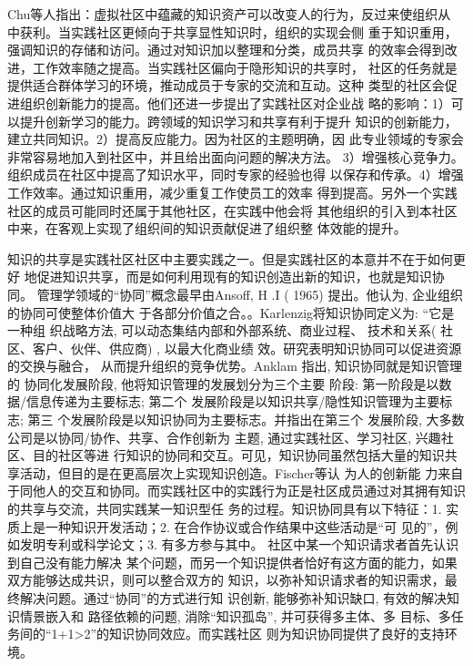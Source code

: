 \documentclass[12pt,a4paper,cs4size]{ctexart}
\begin{document}
Chu等人指出：虚拟社区中蕴藏的知识资产可以改变人的行为，反过来使组织从
中获利\cite{Chu2008}。当实践社区更倾向于共享显性知识时，组织的实现会侧
重于知识重用，强调知识的存储和访问。通过对知识加以整理和分类，成员共享
的效率会得到改进，工作效率随之提高。当实践社区偏向于隐形知识的共享时，
社区的任务就是提供适合群体学习的环境，推动成员于专家的交流和互动。这种
类型的社区会促进组织创新能力的提高。他们还进一步提出了实践社区对企业战
略的影响：1）可以提升创新学习的能力。跨领域的知识学习和共享有利于提升
知识的创新能力，建立共同知识。2）提高反应能力。因为社区的主题明确，因
此专业领域的专家会非常容易地加入到社区中，并且给出面向问题的解决方法。
3）增强核心竞争力。组织成员在社区中提高了知识水平，同时专家的经验也得
以保存和传承。4）增强工作效率。通过知识重用，减少重复工作使员工的效率
得到提高。另外一个实践社区的成员可能同时还属于其他社区，在实践中他会将
其他组织的引入到本社区中来，在客观上实现了组织间的知识贡献促进了组织整
体效能的提升\cite{Garrety2004}。

知识的共享是实践社区社区中主要实践之一。但是实践社区的本意并不在于如何更好
地促进知识共享，而是如何利用现有的知识创造出新的知识，也就是知识协同。
管理学领域的“协同”概念最早由Ansoff, H .I
( 1965) 提出。他认为, 企业组织的协同可使整体价值大
于各部分价值之合。\cite{Ansoff1965}。Karlenzig将知识协同定义为: “它是一种组
织战略方法, 可以动态集结内部和外部系统、商业过程、
技术和关系( 社区、客户、伙伴、供应商) , 以最大化商业绩
效\cite{karlenzig2002tip}。研究表明知识协同可以促进资源的交换与融合，
从而提升组织的竞争优势\cite{ghoshal1998sci}\cite{galunic1998rrf}。Anklam 指出, 知识协同就是知识管理的
协同化发展阶段, 他将知识管理的发展划分为三个主要
阶段: 第一阶段是以数据/信息传递为主要标志; 第二个
发展阶段是以知识共享/隐性知识管理为主要标志; 第三
个发展阶段是以知识协同为主要标志。并指出在第三个
发展阶段, 大多数公司是以协同/协作、共享、合作创新为
主题, 通过实践社区、学习社区, 兴趣社区、目的社区等进
行知识的协同和交互\cite{anklam2002kmc}。可见，知识协同虽然包括大量的知识共
享活动，但目的是在更高层次上实现知识创造\cite{Heiman2004}。Fischer等认
为人的创新能
力来自于同他人的交互和协同\cite{Fischer2005}。而实践社区中的实践行为正是社区成员通过对其拥有知识的共享与交流，共同实践某一知识型任
务的过程。知识协同具有以下特征：1. 实质上是一种知识开发活动；2.  在合作协议或合作结果中这些活动是“可
见的”，例如发明专利或科学论文；3. 有多方参与其中\cite{mckelvey2003dcl}。
社区中某一个知识请求者首先认识到自己没有能力解决
某个问题，而另一个知识提供者恰好有这方面的能力，如果双方能够达成共识，则可以整合双方的
知识，以弥补知识请求者的知识需求，最终解决问题\cite{Leijen2002}。通过“协同”的方式进行知
识创新, 能够弥补知识缺口, 有效的解决知识情景嵌入和
路径依赖的问题, 消除“知识孤岛”, 并可获得多主体、多
目标、多任务间的“1+1>2”的知识协同效应\cite{fanzhiping2007}。而实践社区
则为知识协同提供了良好的支持环境。
\end{document}
